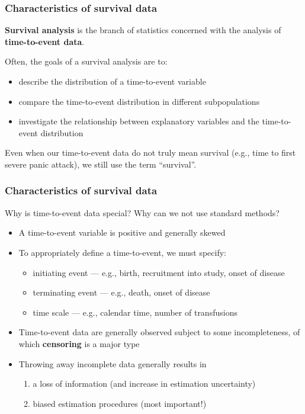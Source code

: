 \documentclass[12pt, 
hyperref={colorlinks=true, linkcolor=blue, urlcolor=cyan},dvipsnames]{beamer}
\begin{document}
\begin{frame}
\frametitle{Characteristics of survival data}
\textbf{Survival analysis} is the branch of statistics concerned with the analysis of \textbf{time-to-event data}.

Often, the goals of a survival analysis are to:
\begin{itemize}
\item describe the distribution of a time-to-event variable
\item compare the time-to-event distribution in different subpopulations
\item investigate the relationship between explanatory variables and the time-to-event distribution
\end{itemize}

Even when our time-to-event data do not truly mean survival (e.g., time to first severe panic attack), we still use the term ``survival''.
\end{frame}

\begin{frame}
\frametitle{Characteristics of survival data}
Why is time-to-event data special? Why can we not use standard methods? \vspace{-0.5cm}
\begin{itemize}
\item A time-to-event variable is positive and generally skewed
\item To appropriately define a time-to-event, we must specify:
{\scriptsize
\begin{itemize}
\item initiating event --- e.g., birth, recruitment into study, onset of disease
\item terminating event --- e.g., death, onset of disease
\item time scale --- e.g., calendar time, number of transfusions
\end{itemize}
}
\item Time-to-event data are generally observed subject to some incompleteness, of which \textbf{censoring} is a major type
\item Throwing away incomplete data generally results in
{\scriptsize
\begin{enumerate}
\item a loss of information (and increase in estimation uncertainty)
\item biased estimation procedures (most important!)
\end{enumerate}
}
\end{itemize}

\end{frame}
\end{document}
